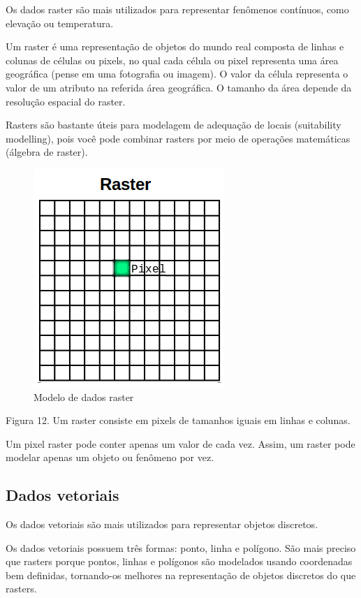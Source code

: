 \documentclass[
]{krantz}
\begin{document}
Os dados raster são mais utilizados para representar fenômenos contínuos, como elevação ou temperatura.

Um raster é uma representação de objetos do mundo real composta de linhas e colunas de células ou pixels, no qual cada célula ou pixel representa uma área geográfica (pense em uma fotografia ou imagem). O valor da célula representa o valor de um atributo na referida área geográfica. O tamanho da área depende da resolução espacial do raster.

Rasters são bastante úteis para modelagem de adequação de locais (suitability modelling), pois você pode combinar rasters por meio de operações matemáticas (álgebra de raster).

\begin{figure}
\centering
\includegraphics{media/modulo0/raster.png}
\caption{Modelo de dados raster}
\end{figure}

Figura 12. Um raster consiste em pixels de tamanhos iguais em linhas e colunas.

Um pixel raster pode conter apenas um valor de cada vez. Assim, um raster pode modelar apenas um objeto ou fenômeno por vez.

\hypertarget{dados-vetoriais}{%
\subsection{Dados vetoriais}\label{dados-vetoriais}}

Os dados vetoriais são mais utilizados para representar objetos discretos.

Os dados vetoriais possuem três formas: ponto, linha e polígono. São mais preciso que rasters porque pontos, linhas e polígonos são modelados usando coordenadas bem definidas, tornando-os melhores na representação de objetos discretos do que rasters.
\end{document}
